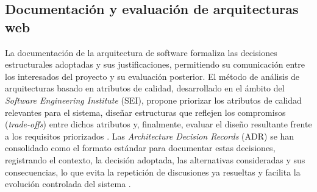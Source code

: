 \subsection{Documentación y evaluación de arquitecturas web}

La documentación de la arquitectura de software formaliza las decisiones estructurales adoptadas y sus justificaciones, permitiendo su comunicación entre los interesados del proyecto y su evaluación posterior. El método de análisis de arquitecturas basado en atributos de calidad, desarrollado en el ámbito del \textit{Software Engineering Institute} (SEI), propone priorizar los atributos de calidad relevantes para el sistema, diseñar estructuras que reflejen los compromisos (\textit{trade-offs}) entre dichos atributos y, finalmente, evaluar el diseño resultante frente a los requisitos priorizados \cite{arxiv_scientific_sw}. Las \textit{Architecture Decision Records} (ADR) se han consolidado como el formato estándar para documentar estas decisiones, registrando el contexto, la decisión adoptada, las alternativas consideradas y sus consecuencias, lo que evita la repetición de discusiones ya resueltas y facilita la evolución controlada del sistema \cite{tecnovy_arch}.
